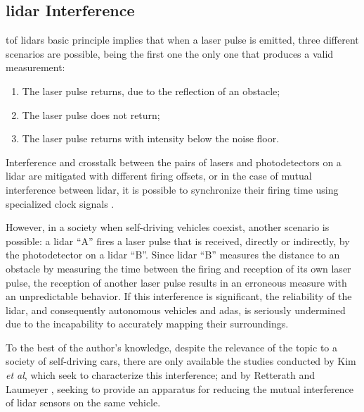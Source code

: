 \documentclass[extendedabs]{recpad2k}
\def\etal{\emph{et al}\bmvaOneDot}
\begin{document}
\subsection{\gls{lidar} Interference}
\gls{tof} \gls{lidar}s basic principle implies that when a laser pulse is emitted, three different scenarios are possible, being the first one the only one that produces a valid measurement:
\begin{enumerate}
    \itemsep0em
    \item The laser pulse returns, due to the reflection of an obstacle;
    \item The laser pulse does not return;
    \item The laser pulse returns with intensity below the noise floor.
\end{enumerate}

Interference and crosstalk between the pairs of lasers and photodetectors on a \gls{lidar} are mitigated with different firing offsets, or in the case of mutual interference between \gls{lidar}, it is possible to synchronize their firing time using specialized clock signals \cite{vlp16}.

However, in a society when self-driving vehicles coexist, another scenario is possible: a \gls{lidar} ``A'' fires a laser pulse that is received, directly or indirectly, by the photodetector on a \gls{lidar} ``B''. Since \gls{lidar} ``B'' measures the distance to an obstacle by measuring the time between the firing and reception of its own laser pulse, the reception of another laser pulse results in an erroneous measure with an unpredictable behavior. If this interference is significant, the reliability of the \gls{lidar}, and consequently autonomous vehicles and \gls{adas}, is seriously undermined due to the incapability to accurately mapping their surroundings.

To the best of the author's knowledge, despite the relevance of the topic to a society of self-driving cars, there are only available the studies conducted by Kim \etal \cite{Kim2017, Kim2015}, which seek to characterize this interference; and by Retterath and Laumeyer \cite{Al.2013}, seeking to provide an apparatus for reducing the mutual interference of \gls{lidar} sensors on the same vehicle.

\end{document}
